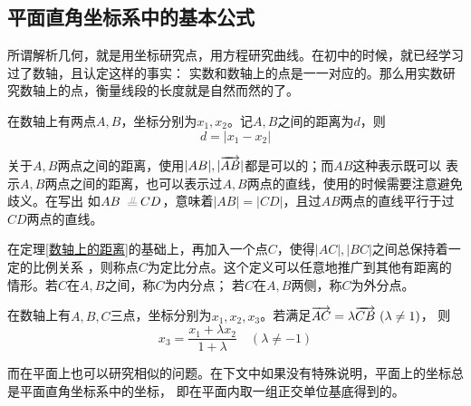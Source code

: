 \subsection{平面直角坐标系中的基本公式}
所谓解析几何，就是用坐标研究点，用方程研究曲线。在初中的时候，就已经学习过了数轴，且认定这样的事实：
实数和数轴上的点是一一对应的。那么用实数研究数轴上的点，衡量线段的长度就是自然而然的了。
\vspace*{-5pt}
\begin{figure}[h]
    \centering
\end{figure}
\vspace*{-5pt}
\begin{theorem}\label{数轴上的距离}在数轴上有两点\(A,B\)，坐标分别为\(x_1,x_2\)。记\(A,B\)之间的距离为\(d\)，则
    \begin{equation}
        d=|x_1-x_2|
    \end{equation}
\end{theorem}

关于\(A,B\)两点之间的距离，使用\(|AB|,|\overrightarrow{AB}|\)都是可以的；而\(AB\)这种表示既可以
表示\(A,B\)两点之间的距离，也可以表示过\(A,B\)两点的直线，使用的时候需要注意避免歧义。在写出
如\(AB\pxqdy CD\)，意味着\(|AB|=|CD|\)，且过\(AB\)两点的直线平行于过\(CD\)两点的直线。

\begin{definition}
    在定理\ref{数轴上的距离}的基础上，再加入一个点\(C\)，使得\(|AC|,|BC|\)之间总保持着一定的比例关系
，则称点\(C\)为定比分点。这个定义可以任意地推广到其他有距离的情形。若\(C\)在\(A,B\)之间，称\(C\)为内分点；
若\(C\)在\(A,B\)两侧，称\(C\)为外分点。
\end{definition}
\begin{theorem}
    在数轴上有\(A,B,C\)三点，坐标分别为\(x_1,x_2,x_3\)。若满足\(\overrightarrow{AC}=\lambda\overrightarrow{CB} \ (\lambda\neq 1)\)，
    则\begin{equation}
        x_3=\frac{x_{1}+\lambda x_{2}}{1+\lambda} \quad(\lambda \neq-1)
    \end{equation}
\end{theorem}

而在平面上也可以研究相似的问题。在下文中如果没有特殊说明，平面上的坐标总是平面直角坐标系中的坐标，
即在平面内取一组正交单位基底得到的。

